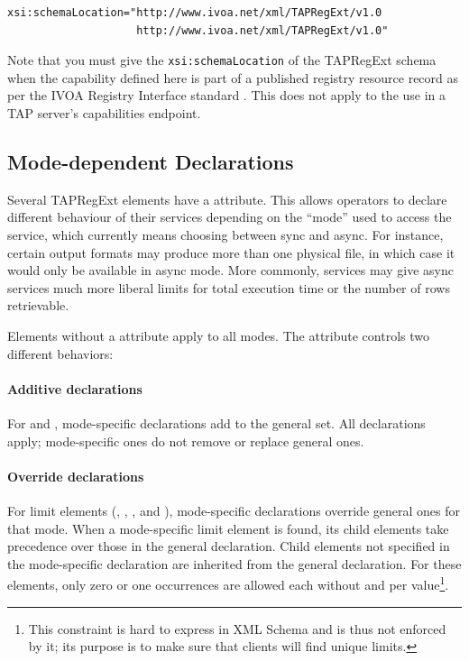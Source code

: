 \documentclass{ivoa}
\begin{document}
\begin{verbatim}
xsi:schemaLocation="http://www.ivoa.net/xml/TAPRegExt/v1.0
                    http://www.ivoa.net/xml/TAPRegExt/v1.0"
\end{verbatim}

Note that you must give the \texttt{xsi:schemaLocation} of
the TAPRegExt schema when the capability defined here is part of a published
registry resource record as per the IVOA Registry Interface standard
\citep{2018ivoa.spec.0723D}.  This does not apply to the use
in a TAP server's capabilities endpoint.


\subsection{Mode-dependent Declarations}
\label{sect:modedep}

Several TAPRegExt elements have a  attribute.  This
allows operators to declare different behaviour of their services
depending on the ``mode'' used to access the service, which currently
means choosing between sync and async.  For instance, certain output
formats may produce more than one physical file, in which case it would
only be available in async mode.  More commonly, services may give async
services much more liberal limits for total execution time or the number
of rows retrievable.

Elements without a  attribute apply to all modes. The
 attribute controls two different behaviors:

\paragraph{Additive declarations}
For  and , mode-specific 
declarations add to the general set. All declarations apply; 
mode-specific ones do not remove or replace general ones.

\paragraph{Override declarations}
For limit elements (, ,
, and ), mode-specific declarations
override general ones for that mode. When a mode-specific limit element
is found, its child elements take precedence over those in the general 
declaration. Child elements not specified in the mode-specific declaration 
are inherited from the general declaration. For these elements, only zero 
or one occurrences are allowed each without  and per 
 value\footnote{This constraint is hard to express in XML
Schema and is thus not enforced by it; its purpose is to make sure that
clients will find unique limits.}.
\end{document}
